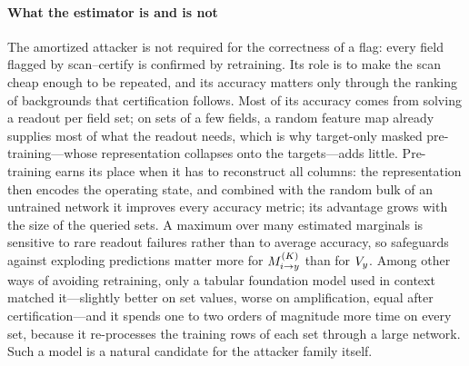 \paragraph{What the estimator is and is not}
The amortized attacker is not required for the correctness of a flag: every field flagged by scan--certify is confirmed
by retraining. Its role is to make the scan cheap enough to be repeated, and its accuracy matters
only through the ranking of backgrounds that certification follows. Most of its accuracy comes from solving a readout
per field set; on sets of a few fields, a random feature map already supplies most of what the readout needs, which is
why target-only masked pre-training---whose representation collapses onto the targets---adds little. Pre-training
earns its place when it has to reconstruct all columns: the representation then encodes the operating state, and combined
with the random bulk of an untrained network it improves every accuracy metric; its advantage grows with the size of the
queried sets. A maximum over many
estimated marginals is sensitive to rare readout failures rather than to average accuracy, so safeguards against
exploding predictions matter more for $M^{(K)}_{i \to y}$ than for $V_{y}$. Among other ways of avoiding retraining, only a tabular foundation model used in context
matched it---slightly better on set values, worse on amplification, equal after certification---and it spends one to two
orders of magnitude more time on every set, because it re-processes the training rows of each set through a large network.
Such a model is a natural candidate for the attacker family itself.

